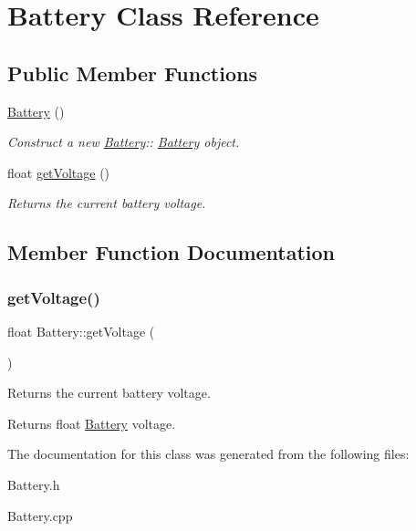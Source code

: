 \hypertarget{class_battery}{}\section{Battery Class Reference}
\label{class_battery}
\subsection*{Public Member Functions}
\begin{DoxyCompactItemize}
\item 
\mbox{\label{class_battery_a36a6234c583e3b3506f4a77e3eb49989}} 
\hyperlink{class_battery_a36a6234c583e3b3506f4a77e3eb49989}{Battery} ()
\begin{DoxyCompactList}\small\item\em Construct a new \hyperlink{class_battery}{Battery}\+:\+: \hyperlink{class_battery}{Battery} object. \end{DoxyCompactList}\item 
float \hyperlink{class_battery_acb115333af9667ce02138fd00afa93ae}{get\+Voltage} ()
\begin{DoxyCompactList}\small\item\em Returns the current battery voltage. \end{DoxyCompactList}\end{DoxyCompactItemize}


\subsection{Member Function Documentation}
\mbox{\label{class_battery_acb115333af9667ce02138fd00afa93ae}} 
\subsubsection{\texorpdfstring{get\+Voltage()}{getVoltage()}}
{\footnotesize\ttfamily float Battery\+::get\+Voltage (\begin{DoxyParamCaption}{ }\end{DoxyParamCaption})}



Returns the current battery voltage. 

\begin{DoxyReturn}{Returns}
float \hyperlink{class_battery}{Battery} voltage. 
\end{DoxyReturn}


The documentation for this class was generated from the following files\+:\begin{DoxyCompactItemize}
\item 
Battery.\+h\item 
Battery.\+cpp\end{DoxyCompactItemize}
